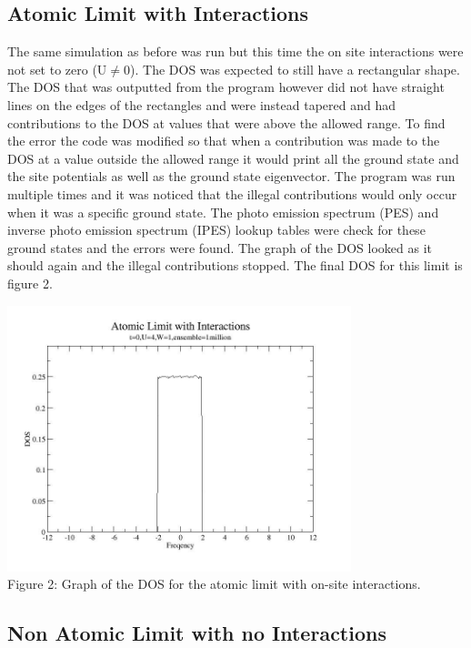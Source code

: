 \documentclass{article}
\begin{document}
\subsection*{Atomic Limit with Interactions}

The same simulation as before was run but this time the on site interactions were not set to zero (U$\ne$0). The DOS was expected to still have a rectangular shape. The DOS that was outputted from the program however did not have straight lines on the edges of the rectangles and were instead tapered and had contributions to the DOS at values that were above the allowed range. To find the error the code was modified so that when a contribution was made to the DOS at a value outside the allowed range it would print all the ground state and the site potentials as well as the ground state eigenvector. The program was run multiple times and it was noticed that the illegal contributions would only occur when it was a specific ground state. The photo emission spectrum (PES) and inverse photo emission spectrum (IPES) lookup tables were check for these ground states and the errors were found. The graph of the DOS looked as it should again and the illegal contributions stopped. The final DOS for this limit is figure 2.

\begin{center}
\includegraphics [width=10cm]{dos_t0u4w12.jpg} \\
Figure 2: Graph of the DOS for the atomic limit with on-site interactions. 
\end{center}
\smallskip

\subsection*{Non Atomic Limit with no Interactions}
\end{document}
